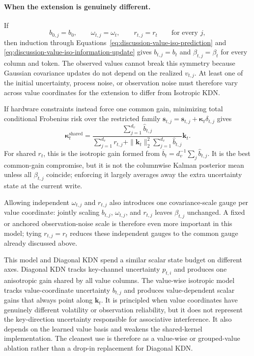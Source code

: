 \documentclass[11pt]{article}
\newcommand{\vct}[1]{\boldsymbol{#1}}
\begin{document}
\paragraph{When the extension is genuinely different.}
If
\begin{equation}
  b_{0,j}=b_0,
  \qquad
  \omega_{t,j}=\omega_t,
  \qquad
  r_{t,j}=r_t
  \qquad\text{for every }j,
  \label{eq:discussion-value-iso-symmetry}
\end{equation}
then induction through Equations~\eqref{eq:discussion-value-iso-prediction} and
\eqref{eq:discussion-value-iso-information-update} gives
$b_{t,j}=b_t$ and $\beta_{t,j}=\beta_t$ for every column and token. The observed values cannot
break this symmetry because Gaussian covariance updates do not depend on the realized
$v_{t,j}$. At least one of the initial uncertainty, process noise, or observation noise must
therefore vary across value coordinates for the extension to differ from Isotropic KDN.

If hardware constraints instead force one common gain, minimizing total conditional Frobenius
risk over the restricted family
$\vct{s}_{t,j}=\widehat{\vct{s}}_{t,j}+\vct{\kappa}_t\delta_{t,j}$ gives
\begin{equation}
  \vct{\kappa}_t^{\mathrm{shared}}
  =\frac{\sum_{j=1}^{d_v}\widehat b_{t,j}}
    {\sum_{j=1}^{d_v}r_{t,j}
      +\|\vct{k}_t\|_2^2\sum_{j=1}^{d_v}\widehat b_{t,j}}
    \vct{k}_t.
  \label{eq:discussion-value-iso-common-gain}
\end{equation}
For shared $r_t$, this is the isotropic gain formed from
$\overline b_t=d_v^{-1}\sum_j\widehat b_{t,j}$. It is the best common-gain compromise, but it is
not the columnwise Kalman posterior mean unless all $\beta_{t,j}$ coincide; enforcing it largely
averages away the extra uncertainty state at the current write.

Allowing independent $\omega_{t,j}$ and $r_{t,j}$ also introduces one covariance-scale gauge per
value coordinate: jointly scaling $b_{t,j}$, $\omega_{t,j}$, and $r_{t,j}$ leaves
$\beta_{t,j}$ unchanged. A fixed or anchored observation-noise scale is therefore even more
important in this model; tying $r_{t,j}=r_t$ reduces these independent gauges to the common gauge
already discussed above.

This model and Diagonal KDN spend a similar scalar state budget on different axes. Diagonal KDN
tracks key-channel uncertainty $p_{t,i}$ and produces one anisotropic gain shared by all value
columns. The value-wise isotropic model tracks value-coordinate uncertainty $b_{t,j}$ and
produces value-dependent scalar gains that always point along $\vct{k}_t$. It is principled when
value coordinates have genuinely different volatility or observation reliability, but it does
not represent the key-direction uncertainty responsible for associative interference. It also
depends on the learned value basis and weakens the shared-kernel implementation. The cleanest use
is therefore as a value-wise or grouped-value ablation rather than a drop-in replacement for
Diagonal KDN.
\end{document}
